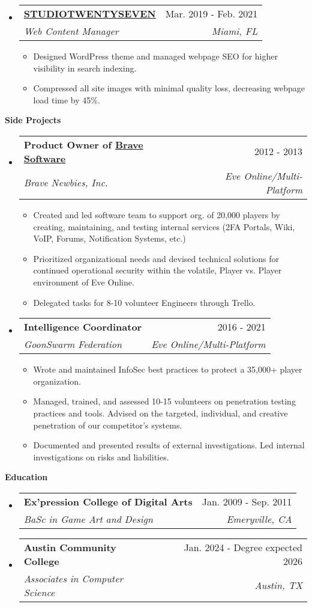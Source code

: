 \documentclass[letterpaper,10pt]{article}[leftmargin=*]
\makeatletter
\def \entryspacing {-0pt}
\renewcommand{\section}[2]{\vspace{5pt}
  \colorbox{secondary}{\color{white}\raggedbottom\normalsize\textbf{{#1}{\hspace{7pt}#2}}}
}
\newcommand{\resumeEntryStart}{\begin{itemize}[leftmargin=2.5mm]}
\newcommand{\resumeEntryEnd}{\end{itemize}\vspace{\entryspacing}}
\newcommand{\resumeItemListStart}{\begin{itemize}[leftmargin=4.5mm]}
\newcommand{\resumeItemListEnd}{\end{itemize}}
\newcommand{\resumeItem}[1]{
  \item\small{
    {#1 \vspace{-2pt}}
  }
}
\newcommand{\resumeEntryTSDL}[4]{
  \vspace{-1pt}\item[]
    \begin{tabularx}{0.97\textwidth}{X@{\hspace{60pt}}r}
      \textbf{\color{primary}#1} & {\firabook\color{accent}\small#2} \\
      \textit{\color{accent}\small#3} & \textit{\color{accent}\small#4} \\
    \end{tabularx}\vspace{-6pt}
}
\makeatother
\begin{document}
  \resumeEntryStart
    \resumeEntryTSDL
      {\href{https://studiotwentyseven.com/}{STUDIOTWENTYSEVEN}}{Mar. 2019 - Feb. 2021}
      {Web Content Manager}{Miami, FL}
    \resumeItemListStart
      \resumeItem{Designed WordPress theme and managed webpage SEO for higher visibility in search indexing.}
      \resumeItem{Compressed all site images with minimal quality loss, decreasing webpage load time by 45\%.}
    \resumeItemListEnd
  \resumeEntryEnd

\section{\faFlask}{Side Projects}

  \resumeEntryStart
    \resumeEntryTSDL
      {Product Owner of \href{https://github.com/bravecollective}{Brave Software} }{2012 - 2013}
      {Brave Newbies, Inc.}{Eve Online/Multi-Platform}
    \resumeItemListStart
      \resumeItem {Created and led software team to support org. of 20,000 players by creating, maintaining, and testing internal services (2FA Portals, Wiki, VoIP, Forums, Notification Systems, etc.)}
      \resumeItem {Prioritized organizational needs and devised technical solutions for continued operational security within the volatile, Player vs. Player environment of Eve Online.}
      \resumeItem {Delegated tasks for 8-10 volunteer Engineers through Trello.}
    \resumeItemListEnd
  \resumeEntryEnd

  \resumeEntryStart
    \resumeEntryTSDL
      {Intelligence Coordinator}{2016 - 2021}
      {GoonSwarm Federation}{Eve Online/Multi-Platform}
    \resumeItemListStart
      \resumeItem {Wrote and maintained InfoSec best practices to protect a 35,000+ player organization. }
      \resumeItem {Managed, trained, and assessed 10-15 volunteers on penetration testing practices and tools. Advised on the targeted, individual, and creative penetration of our competitor's systems. }
      \resumeItem{Documented and presented results of external investigations. Led internal investigations on risks and liabilities. }
    \resumeItemListEnd
  \resumeEntryEnd

\section{\faGraduationCap}{Education}

  \resumeEntryStart
    \resumeEntryTSDL
      {Ex’pression College of Digital Arts}{Jan. 2009 - Sep. 2011}
      {BaSc in Game Art and Design}{Emeryville, CA}
      \resumeEntryTSDL
      {Austin Community College}{Jan. 2024 - Degree expected 2026} 
      {Associates in Computer Science}{Austin, TX}
  \resumeEntryEnd
\end{document}
